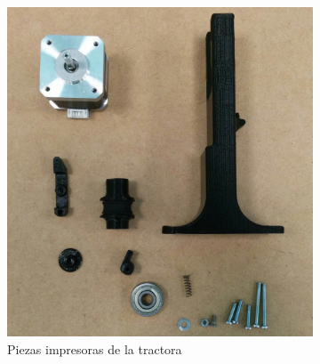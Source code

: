 \begin{figure}[H]
    \centering
    \begin{subfigure}[b]{0.3\textwidth}
        \centering
        \includegraphics[width=\linewidth]{images/producciones/tractora/IMG_20150804_085937.jpg}
        \caption{Piezas impresoras de la tractora}
        \label{fig:tractora_piezas}
    \end{subfigure}
    ~
    \begin{subfigure}[b]{0.3\textwidth}
            \centering

\end{subfigure}
\end{figure}
